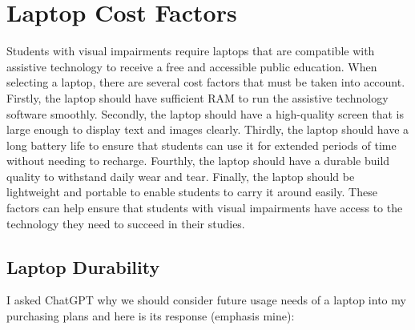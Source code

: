 \pagebreak \hypertarget{notes-on-future-proofing-laptops}{}\section{Laptop Cost Factors}\label{notes-on-future-proofing-laptops}
Students with visual impairments require laptops that are compatible with assistive technology to receive a free and accessible public education. When selecting a laptop, there are several cost factors that must be taken into account. Firstly, the laptop should have sufficient RAM to run the assistive technology software smoothly. Secondly, the laptop should have a high-quality screen that is large enough to display text and images clearly. Thirdly, the laptop should have a long battery life to ensure that students can use it for extended periods of time without needing to recharge. Fourthly, the laptop should have a durable build quality to withstand daily wear and tear. Finally, the laptop should be lightweight and portable to enable students to carry it around easily. These factors can help ensure that students with visual impairments have access to the technology they need to succeed in their studies.

\hypertarget{future-proofing}{}\subsection{Laptop Durability}\label{future-proofing}

I asked ChatGPT why we should consider future usage needs of a laptop into my purchasing plans and here is its response (emphasis mine):

